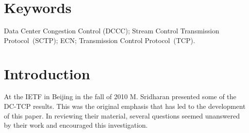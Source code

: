 \documentclass[12pt]{article}
\begin{document}
\section*{Keywords}
Data Center Congestion Control (DCCC);
Stream Control Transmission Protocol~(SCTP);
ECN;
Transmission Control Protocol~(TCP).

\section{Introduction}
At the IETF in Beijing in the fall of 2010 M. Sridharan presented some of the DC-TCP results.
This was the original emphasis that has led to the development of
this paper. In reviewing their material, several questions seemed unanswered by their
work and encouraged this investigation.
\end{document}
